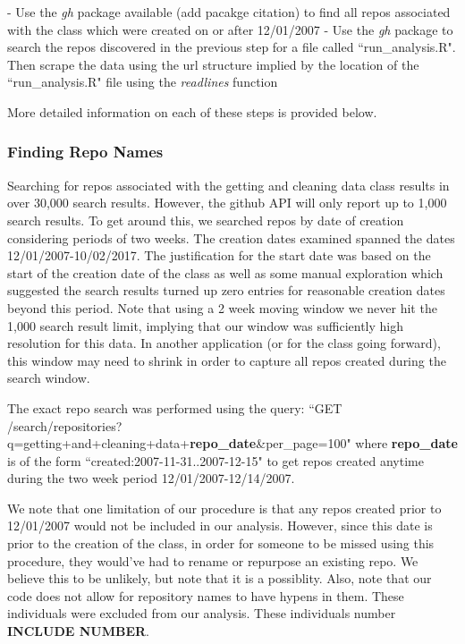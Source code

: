 \documentclass[12pt]{article}\usepackage[]{graphicx}\usepackage[]{color}
\begin{document}
 - Use the {\it gh} package available ({\color{red}add pacakge citation}) 
to find all repos associated with the class which were created on or after 12/01/2007
 - Use the {\it gh} package to search the repos discovered in the previous step for a file called ``run\_analysis.R". Then 
 scrape the data using the url structure implied by the location of the ``run\_analysis.R" file using the 
 {\it readlines} function

More detailed information on each of these steps is provided below.

\subsubsection{Finding Repo Names}


Searching for repos associated with the getting and cleaning data class results in over 30,000 search results. 
However, the github API will only report up to 1,000 search results. To get around this, we searched repos by date of creation 
considering periods of two weeks. The creation dates examined spanned the dates 12/01/2007-10/02/2017. 
The justification for the start date was based on the start of the creation date of the class as well as 
some manual exploration which suggested the search results turned up zero entries for reasonable creation dates beyond this period. 
Note that using a 2 week moving window we never hit the 1,000 search result limit, implying that our window was sufficiently high 
resolution for this data. In another application (or for the class going forward), this window may need to shrink in order to capture 
all repos created during the search window.

The exact repo search was performed using the query: 
``GET /search/repositories?q=getting+and+cleaning+data+\textbf{repo\_date}\&per\_page=100" where \textbf{repo\_date} is of the form 
``created:2007-11-31..2007-12-15" to get repos created anytime during the two week period 12/01/2007-12/14/2007. 

We note that one limitation of our procedure is that any repos created prior to 12/01/2007 would not be included in our analysis. 
However, since this date is prior to the creation of the class, in order for someone to be missed using this procedure, they would've 
had to rename or repurpose an existing repo. We believe this to be unlikely, but note that it is a possiblity.
Also, note that our code does not allow for repository names to have hypens in them. These individuals were excluded from our 
analysis. These individuals number {\color{red}\textbf{INCLUDE NUMBER}}.
\end{document}
